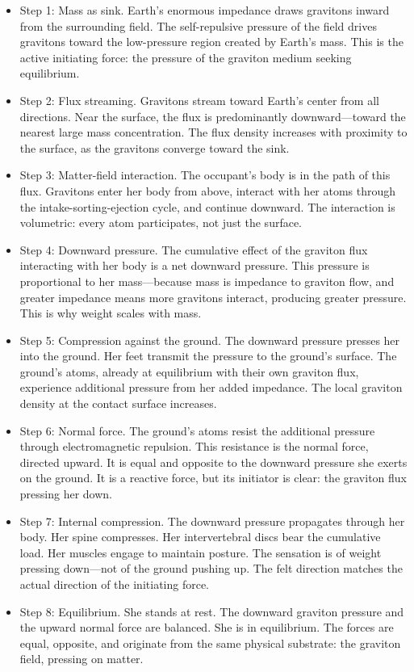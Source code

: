 \documentclass[11pt]{article}
\begin{document}
\begin{itemize}
\item
  Step 1: Mass as sink. Earth's enormous impedance draws gravitons inward from the surrounding field. The self-repulsive pressure of the field drives gravitons toward the low-pressure region created by Earth's mass. This is the active initiating force: the pressure of the graviton medium seeking equilibrium.
\item
  Step 2: Flux streaming. Gravitons stream toward Earth's center from all directions. Near the surface, the flux is predominantly downward---toward the nearest large mass concentration. The flux density increases with proximity to the surface, as the gravitons converge toward the sink.
\item
  Step 3: Matter-field interaction. The occupant's body is in the path of this flux. Gravitons enter her body from above, interact with her atoms through the intake-sorting-ejection cycle, and continue downward. The interaction is volumetric: every atom participates, not just the surface.
\item
  Step 4: Downward pressure. The cumulative effect of the graviton flux interacting with her body is a net downward pressure. This pressure is proportional to her mass---because mass is impedance to graviton flow, and greater impedance means more gravitons interact, producing greater pressure. This is why weight scales with mass.
\item
  Step 5: Compression against the ground. The downward pressure presses her into the ground. Her feet transmit the pressure to the ground's surface. The ground's atoms, already at equilibrium with their own graviton flux, experience additional pressure from her added impedance. The local graviton density at the contact surface increases.
\item
  Step 6: Normal force. The ground's atoms resist the additional pressure through electromagnetic repulsion. This resistance is the normal force, directed upward. It is equal and opposite to the downward pressure she exerts on the ground. It is a reactive force, but its initiator is clear: the graviton flux pressing her down.
\item
  Step 7: Internal compression. The downward pressure propagates through her body. Her spine compresses. Her intervertebral discs bear the cumulative load. Her muscles engage to maintain posture. The sensation is of weight pressing down---not of the ground pushing up. The felt direction matches the actual direction of the initiating force.
\item
  Step 8: Equilibrium. She stands at rest. The downward graviton pressure and the upward normal force are balanced. She is in equilibrium. The forces are equal, opposite, and originate from the same physical substrate: the graviton field, pressing on matter.
\end{itemize}
\end{document}
